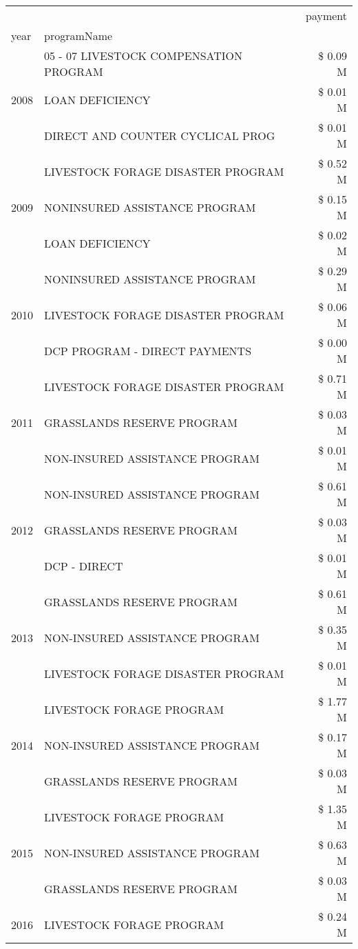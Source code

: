 \begin{tabular}{llr}
\toprule
 &  & payment \\
year & programName &  \\
\midrule
\multirow[t]{3}{*}{2008} & 05 - 07 LIVESTOCK COMPENSATION PROGRAM & \$ 0.09 M \\
 & LOAN DEFICIENCY & \$ 0.01 M \\
 & DIRECT AND COUNTER CYCLICAL PROG & \$ 0.01 M \\
\cline{1-3}
\multirow[t]{3}{*}{2009} & LIVESTOCK FORAGE DISASTER  PROGRAM & \$ 0.52 M \\
 & NONINSURED ASSISTANCE PROGRAM & \$ 0.15 M \\
 & LOAN DEFICIENCY & \$ 0.02 M \\
\cline{1-3}
\multirow[t]{3}{*}{2010} & NONINSURED ASSISTANCE PROGRAM & \$ 0.29 M \\
 & LIVESTOCK FORAGE DISASTER  PROGRAM & \$ 0.06 M \\
 & DCP PROGRAM - DIRECT PAYMENTS & \$ 0.00 M \\
\cline{1-3}
\multirow[t]{3}{*}{2011} & LIVESTOCK FORAGE DISASTER PROGRAM & \$ 0.71 M \\
 & GRASSLANDS RESERVE PROGRAM & \$ 0.03 M \\
 & NON-INSURED ASSISTANCE PROGRAM & \$ 0.01 M \\
\cline{1-3}
\multirow[t]{3}{*}{2012} & NON-INSURED ASSISTANCE PROGRAM & \$ 0.61 M \\
 & GRASSLANDS RESERVE PROGRAM & \$ 0.03 M \\
 & DCP - DIRECT & \$ 0.01 M \\
\cline{1-3}
\multirow[t]{3}{*}{2013} & GRASSLANDS RESERVE PROGRAM & \$ 0.61 M \\
 & NON-INSURED ASSISTANCE PROGRAM & \$ 0.35 M \\
 & LIVESTOCK FORAGE DISASTER PROGRAM & \$ 0.01 M \\
\cline{1-3}
\multirow[t]{3}{*}{2014} & LIVESTOCK FORAGE PROGRAM & \$ 1.77 M \\
 & NON-INSURED ASSISTANCE PROGRAM & \$ 0.17 M \\
 & GRASSLANDS RESERVE PROGRAM & \$ 0.03 M \\
\cline{1-3}
\multirow[t]{3}{*}{2015} & LIVESTOCK FORAGE PROGRAM & \$ 1.35 M \\
 & NON-INSURED ASSISTANCE PROGRAM & \$ 0.63 M \\
 & GRASSLANDS RESERVE PROGRAM & \$ 0.03 M \\
\cline{1-3}
\multirow[t]{3}{*}{2016} & LIVESTOCK FORAGE PROGRAM & \$ 0.24 M \\

\end{tabular}
